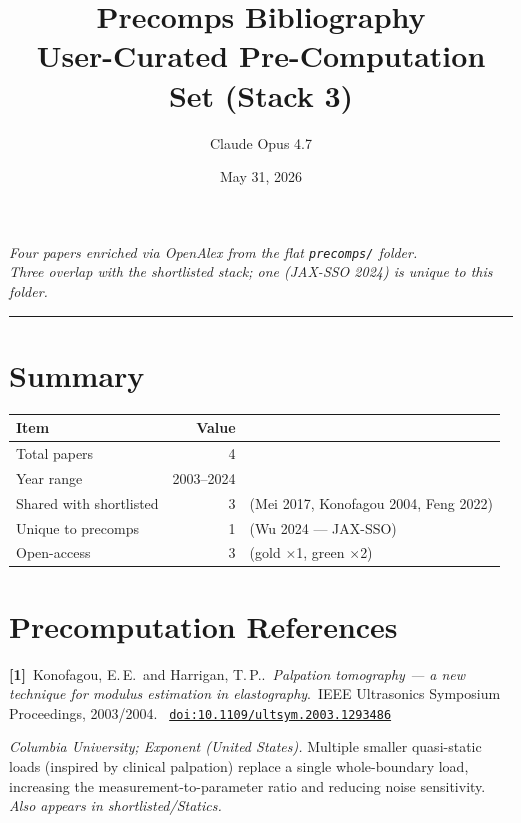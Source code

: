 \documentclass[11pt]{article}
\title{Precomps Bibliography \\[4pt]
  \large User-Curated Pre-Computation Set (Stack 3)}
\author{Claude Opus 4.7}
\date{May 31, 2026}
\newcommand{\bibentry}[6]{%
  \noindent\textbf{[#1]}~#2.~\textit{#3}.~#4, #5.~%
  \href{https://doi.org/#6}{\texttt{doi:#6}}\par\vspace{6pt}
}
\begin{document}
\maketitle
\thispagestyle{fancy}

\begin{center}
\small\itshape
Four papers enriched via OpenAlex from the flat \texttt{precomps/} folder. \\
Three overlap with the shortlisted stack; one (JAX-SSO 2024) is unique to this folder.
\end{center}

\vspace{1em}
\hrule
\vspace{1em}

\section*{Summary}

\begin{tabular}{@{}lrl@{}}
\textbf{Item} & \textbf{Value} & \\
\hline
Total papers          & 4 & \\
Year range            & 2003--2024 & \\
Shared with shortlisted & 3 & (Mei 2017, Konofagou 2004, Feng 2022) \\
Unique to precomps    & 1 & (Wu 2024 --- JAX-SSO) \\
Open-access           & 3 & (gold $\times$1, green $\times$2) \\
\hline
\end{tabular}

\vspace{1em}

\section{Precomputation References}

\bibentry{1}{Konofagou, E.\,E.\ and Harrigan, T.\,P.}{Palpation tomography --- a new technique for modulus estimation in elastography}{IEEE Ultrasonics Symposium Proceedings}{2003/2004}{10.1109/ultsym.2003.1293486}

\textit{Columbia University; Exponent (United States).}\quad
Multiple smaller quasi-static loads (inspired by clinical palpation) replace a single whole-boundary load, increasing the measurement-to-parameter ratio and reducing noise sensitivity. \emph{Also appears in shortlisted/Statics.}
\end{document}
